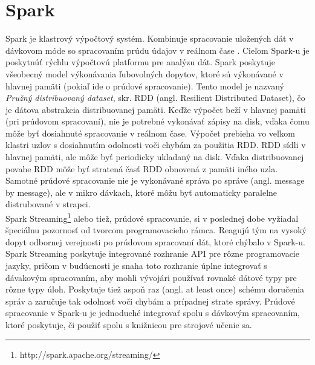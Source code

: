 \section{Spark}
Spark je klastrový výpočtový systém. Kombinuje spracovanie uložených dát v dávkovom móde so spracovaním prúdu údajov v reálnom čase \citep{cimerman2015prudy}. Cieľom Spark-u je poskytnúť rýchlu výpočtovú platformu pre analýzu dát. Spark poskytuje všeobecný model výkonávania ľubovolných dopytov, ktoré sú výkonávané v hlavnej pamäti (pokiaľ ide o prúdové spracovanie). Tento model je nazvaný \textit{Pružný distribuovaný dataset}, skr. RDD (angl. Resilient Distributed Dataset), čo je dátova abstrakcia distribuovanej pamäti. Keďže výpočet beží v hlavnej pamäti (pri prúdovom spracovaní), nie je potrebné vykonávať zápisy na disk, vďaka čomu môže byť dosiahnuté spracovanie v reálnom čase. Výpočet prebieha vo veľkom klastri uzlov s dosiahnutím odolnosti voči chybám za použitia RDD. RDD  sídli v hlavnej pamäti, ale môže byť periodicky ukladaný na disk. Vďaka distribuovanej povahe RDD môže byť stratená časť RDD obnovená z pamäti iného uzla. Samotné prúdové spracovanie nie je vykonávané správa po správe (angl. message by message), ale v mikro dávkach, ktoré môžu byť automaticky paralelne distrubované v strapci.\\
Spark Streaming\footnote{http://spark.apache.org/streaming/} alebo tiež, prúdové spracovanie, si v poslednej dobe vyžiadal špeciálnu pozornosť od tvorcom programovacieho rámca. Reagujú tým na vysoký dopyt odbornej verejnosti po prúdovom spracovaní dát, ktoré chýbalo v Spark-u. Spark Streaming poskytuje integrované rozhranie API pre rôzne programovacie jazyky, pričom v budúcnosti je snaha toto rozhranie úplne integrovať s dávakovým spracovaním, aby mohli vývojári používať rovnaké dátové typy pre rôzne typy úloh. Poskytuje tiež aspoň raz (angl. at least once) schému doručenia správ a zaručuje tak odolnosť voči chybám a prípadnej strate správy. Prúdové spracovanie v Spark-u je jednoduché integrovať spolu s dávkovým spracovaním, ktoré poskytuje, či použiť spolu s knižnicou pre strojové učenie sa. 




















